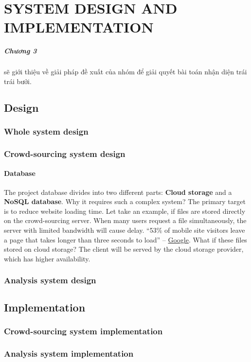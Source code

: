 \chapter{SYSTEM DESIGN AND IMPLEMENTATION}
\label{chap:caseFarming}
\paragraph{Chương 3} sẽ giới thiệu về giải pháp đề xuất của nhóm để giải quyết bài toán nhận diện trái trái bưởi.


\section{Design}
\subsection{Whole system design}
\subsection{Crowd-sourcing system design}
\subsubsection{Database}
The project database divides into two different parts: \textbf{Cloud storage} and a \textbf{NoSQL database}. Why it requires such a complex system? The primary target is to reduce website loading time. Let take an example, if files are stored directly on the crowd-sourcing server. When many users request a file simultaneously, the server with limited bandwidth will cause delay. “53\% of mobile site visitors leave a page that takes longer than three seconds to load” – \href{https://think.storage.googleapis.com/docs/mobile-page-speed-new-industry-benchmarks.pdf}{Google}. What if these files stored on cloud storage? The client will be served by the cloud storage provider, which has higher availability.
\subsection{Analysis system design}
\section{Implementation}
\subsection{Crowd-sourcing system implementation}
\subsection{Analysis system implementation}

